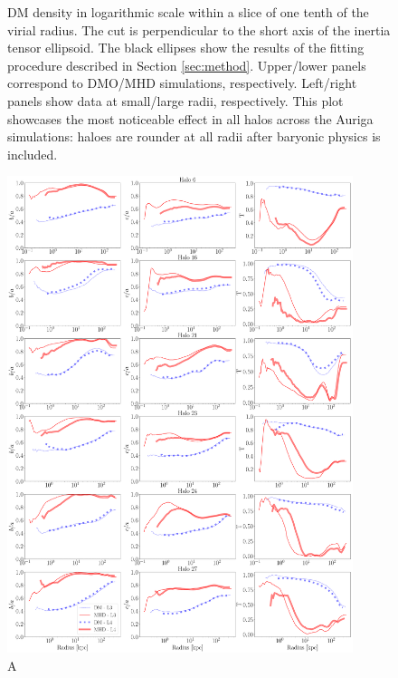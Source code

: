 \documentclass[usenatbib]{mnras}
\begin{document}
\begin{figure}
  \caption{DM density in logarithmic scale within a slice of one tenth
    of the virial radius.
    The cut is perpendicular to the short axis of the inertia tensor ellipsoid.
    The black ellipses show the results of the fitting procedure
    described in Section \ref{sec:method}. 
    Upper/lower panels correspond to DMO/MHD simulations, respectively.
    Left/right panels show data at small/large radii, respectively.
    This plot showcases the most noticeable effect in all halos
    across the Auriga simulations: haloes are rounder at all radii
    after baryonic physics is included.}
\label{fig:slices}
\end{figure}


\begin{figure}
\includegraphics[width=0.9\textwidth]{shape_resolution.pdf}
\caption{A}
\label{fig:resolution}
\end{figure}
\end{document}
